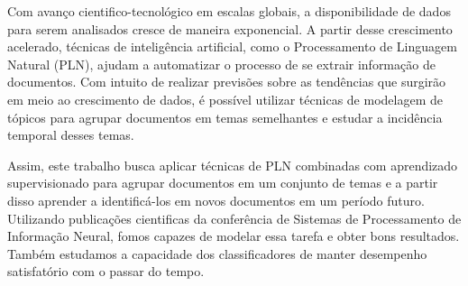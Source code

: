 Com avanço cientifico-tecnológico em escalas globais, a disponibilidade de dados para serem analisados cresce de maneira exponencial. A partir desse crescimento acelerado, técnicas de inteligência artificial, como o Processamento de Linguagem Natural (PLN), ajudam a automatizar o processo de se extrair informação de documentos.  Com intuito de realizar previsões sobre as tendências que surgirão em meio ao crescimento de dados, é possível utilizar técnicas de modelagem de tópicos para agrupar documentos em temas semelhantes e estudar a incidência temporal desses temas.

Assim, este trabalho busca aplicar técnicas de PLN combinadas com aprendizado supervisionado para agrupar documentos em um conjunto de temas e a partir disso aprender a identificá-los em novos documentos em um período futuro. Utilizando publicações cientificas da conferência de Sistemas de Processamento de Informação Neural, fomos capazes de modelar essa tarefa e obter bons resultados.  Também estudamos a capacidade dos classificadores de manter desempenho satisfatório com o passar do tempo.
